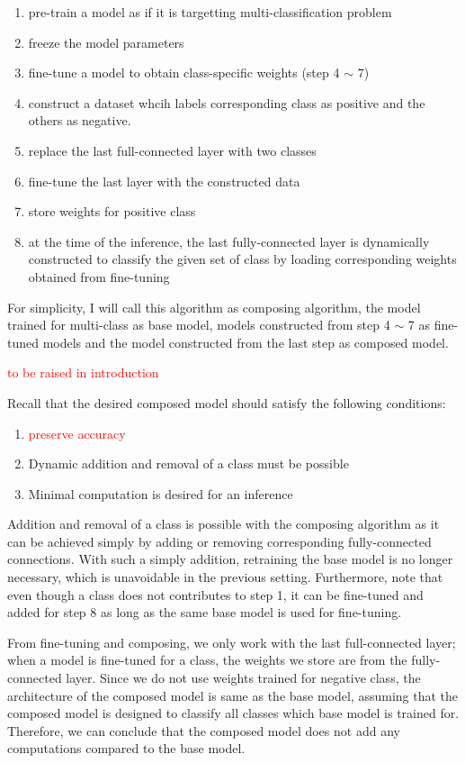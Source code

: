 \documentclass{article}
\newcommand{\red}[1]{\textcolor{red}{#1}}
\begin{document}
\begin{enumerate}
	\item pre-train a model as if it is targetting multi-classification problem
	\item freeze the model parameters
	\item fine-tune a model to obtain class-specific weights (step 4 $\sim$ 7)
	\item construct a dataset whcih labels corresponding class as positive and the others as negative.
	\item replace the last full-connected layer with two classes
	\item fine-tune the last layer with the constructed data
	\item store weights for positive class
	\item at the time of the inference, the last fully-connected layer is dynamically constructed to classify the given set of class by loading corresponding weights obtained from fine-tuning
\end{enumerate}

For simplicity, I will call this algorithm as composing algorithm, the model trained for multi-class as base model, models constructed from step 4 $\sim$ 7 as fine-tuned models and the model constructed from the last step as composed model.

\red{to be raised in introduction}

Recall that the desired composed model should satisfy the following conditions:

\begin{enumerate}
	\item \red{preserve accuracy} 
	\item Dynamic addition and removal of a class must be possible
	\item Minimal computation is desired for an inference
\end{enumerate}

Addition and removal of a class is possible with the composing algorithm as it can be achieved simply by adding or removing corresponding fully-connected connections.
With such a simply addition, retraining the base model is no longer necessary, which is unavoidable in the previous setting. Furthermore, note that even though a class does not contributes to step 1, it can be fine-tuned and added for step 8 as long as the same base model is used for fine-tuning.

From fine-tuning and composing, we only work with the last full-connected layer; when a model is fine-tuned for a class, the weights we store are from the fully-connected layer.
Since we do not use weights trained for negative class, the architecture of the composed model is same as the base model, assuming that the composed model is designed to classify all classes which base model is trained for. Therefore, we can conclude that the composed model does not add any computations compared to the base model.
\end{document}
